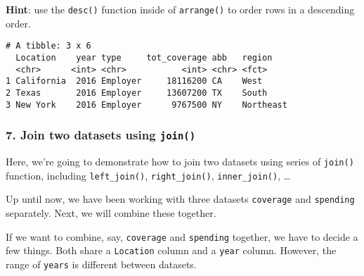 \documentclass[]{article}
\newenvironment{Shaded}{\begin{snugshade}}{\end{snugshade}}
\newcommand{\DataTypeTok}[1]{\textcolor[rgb]{0.13,0.29,0.53}{#1}}
\newcommand{\DecValTok}[1]{\textcolor[rgb]{0.00,0.00,0.81}{#1}}
\newcommand{\KeywordTok}[1]{\textcolor[rgb]{0.13,0.29,0.53}{\textbf{#1}}}
\newcommand{\NormalTok}[1]{#1}
\newcommand{\OperatorTok}[1]{\textcolor[rgb]{0.81,0.36,0.00}{\textbf{#1}}}
\newcommand{\StringTok}[1]{\textcolor[rgb]{0.31,0.60,0.02}{#1}}
\begin{document}
\textbf{Hint}: use the \texttt{desc()} function inside of
\texttt{arrange()} to order rows in a descending order.

\begin{Shaded}
\end{Shaded}

\begin{verbatim}
# A tibble: 3 x 6
  Location    year type     tot_coverage abb   region   
  <chr>      <int> <chr>           <int> <chr> <fct>    
1 California  2016 Employer     18116200 CA    West     
2 Texas       2016 Employer     13607200 TX    South    
3 New York    2016 Employer      9767500 NY    Northeast
\end{verbatim}

\hypertarget{join-two-datasets-using-join}{%
\subsubsection{\texorpdfstring{7. Join two datasets using
\texttt{join()}}{7. Join two datasets using join()}}\label{join-two-datasets-using-join}}

Here, we're going to demonstrate how to join two datasets using series
of \texttt{join()} function, including \texttt{left\_join()},
\texttt{right\_join()}, \texttt{inner\_join()}, \ldots{}

Up until now, we have been working with three datasets \texttt{coverage}
and \texttt{spending} separately. Next, we will combine these together.

If we want to combine, say, \texttt{coverage} and \texttt{spending}
together, we have to decide a few things. Both share a \texttt{Location}
column and a \texttt{year} column. However, the range of \texttt{years}
is different between datasets.

\begin{Shaded}
\end{Shaded}
\end{document}
